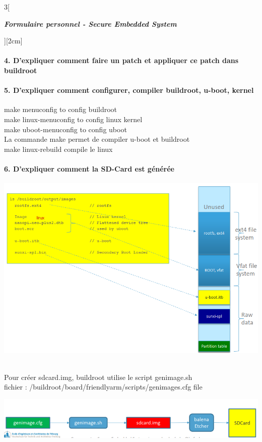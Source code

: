 \begin{multicols}{3}[\centerline{ \large\em \textbf{Formulaire personnel - Secure Embedded System}}][2cm]
\paragraph*{4. D’expliquer comment faire un patch et appliquer ce patch dans buildroot\\}

\paragraph*{5. D’expliquer comment configurer, compiler buildroot, u-boot, kernel\\}
make menuconfig to config buildroot\\
make linux-menuconfig to config linux kernel\\
make uboot-menuconfig to config uboot\\
La commande make permet de compiler u-boot et buildroot\\
make linux-rebuild compile le linux\\
\paragraph*{6. D’expliquer comment la SD-Card est générée\\}
\begin{minipage}{\linewidth}
	\centering
    \includegraphics[width =0.8\columnwidth]{images/5.png}
\end{minipage}\\
Pour créer sdcard.img, buildroot utilise le script genimage.sh \\
fichier : /buildroot/board/friendlyarm/scripts/genimages.cfg file\\
\begin{minipage}{\linewidth}
	\centering
    \includegraphics[width =0.8\columnwidth]{images/11.png}
\end{minipage}\\

\end{multicols}
